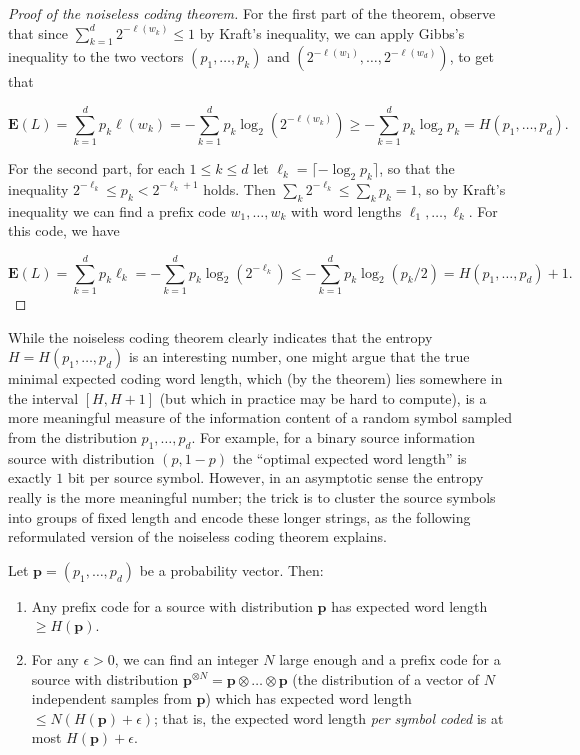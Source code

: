 \begin{proof}[Proof of the noiseless coding theorem]
For the first part of the theorem, observe that since
$\sum_{k=1}^d 2^{-\ell(w_k)}\le 1$ by Kraft's
inequality, we can apply Gibbs's inequality to the two
vectors $(p_1,\ldots,p_k)$ and
$(2^{-\ell(w_1)}, \ldots, 2^{-\ell(w_d)})$, to get
that

\[
\mathbf{E}(L) = \sum_{k=1}^d p_k \ell(w_k) = -\sum_{k=1}^d p_k \log_2 \left(2^{-\ell(w_k)}\right) \ge -\sum_{k=1}^d p_k \log_2 p_k = H(p_1,\ldots,p_d).
\]

\noindent For the second part, for each $1\le k\le d$ let
$\ell_k = \lceil -\log_2 p_k\rceil$, so that the
inequality $2^{-\ell_k} \le p_k < 2^{-\ell_k+1}$
holds. Then $\sum_k 2^{-\ell_k} \le \sum_k p_k = 1$,
so by Kraft's inequality we can find a prefix code
$w_1,\ldots,w_k$ with word lengths
$\ell_1,\ldots,\ell_k$. For this code, we have

\[
\mathbf{E}(L) = \sum_{k=1}^d p_k \ell_k = -\sum_{k=1}^d p_k \log_2\left(2^{-\ell_k}\right)
\le -\sum_{k=1}^d p_k \log_2 (p_k/2) = H(p_1,\ldots,p_d) + 1.
\]

\end{proof}

\noindent While the noiseless coding theorem clearly indicates
that the entropy $H=H(p_1,\ldots,p_d)$ is an
interesting number, one might argue that the true
minimal expected coding word length, which (by the
theorem) lies somewhere in the interval $[H,H+1]$
(but which in practice may be hard to compute), is a
more meaningful measure of the information content of
a random symbol sampled from the distribution
$p_1,\ldots,p_d$. For example, for a binary source
information source with distribution $(p,1-p)$ the
``optimal expected word length'' is exactly $1$ bit
per source symbol. However, in an asymptotic sense the
entropy really is the more meaningful number; the
trick is to cluster the source symbols into groups of
fixed length and encode these longer strings, as the
following reformulated version of the noiseless coding
theorem explains.

\begin{cor}
Let $\mathbf{p}=(p_1,\ldots,p_d)$ be a probability
vector. Then:

\begin{enumerate}[label=\arabic*.]
\item Any prefix code for a source with distribution
$\mathbf{p}$ has expected word length
$\ge H(\mathbf{p})$.

\item For any $\epsilon>0$, we can find an integer $N$
large enough and a prefix code for a source with
distribution
$\mathbf{p}^{\otimes
N}=\mathbf{p}\otimes\ldots\otimes\mathbf{p}$
(the distribution of a vector of $N$ independent
samples from $\mathbf{p}$) which has expected word
length $\le N(H(\mathbf{p})+\epsilon)$; that is, the
expected word length \emph{per symbol coded} is at most
$H(\mathbf{p})+\epsilon$.
\end{enumerate}

\end{cor}

